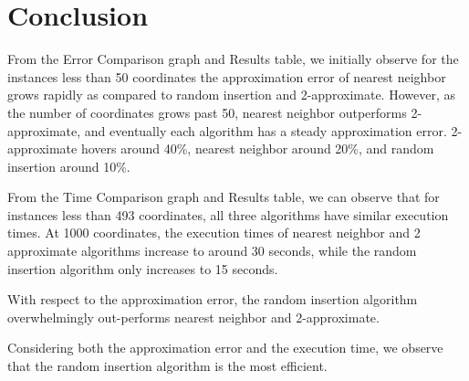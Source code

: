 \section{Conclusion}\label{conclusion}

 From the Error Comparison graph and Results table, we initially observe for the instances less than 50 coordinates the approximation error of nearest neighbor grows rapidly as compared to random insertion and 2-approximate. However, as the number of coordinates grows past 50, nearest neighbor outperforms 2-approximate, and eventually each algorithm has a steady approximation error. 2-approximate hovers around 40\%, nearest neighbor around 20\%, and random insertion around 10\%. 
 
 \linebreak
 
 \noindent From the Time Comparison graph and Results table, we can observe that for instances less than 493 coordinates, all three algorithms have similar execution times. At 1000 coordinates, the execution times of nearest neighbor and 2 approximate algorithms increase to around 30 seconds, while the random insertion algorithm only increases to 15 seconds. 
 
 \linebreak
 
 \noindent With respect to the approximation error, the random insertion algorithm overwhelmingly out-performs nearest neighbor and 2-approximate.
 
 \linebreak
 
\noindent Considering both the approximation error and the execution time, we observe that the random insertion algorithm is the most efficient. 

\pagebreak
